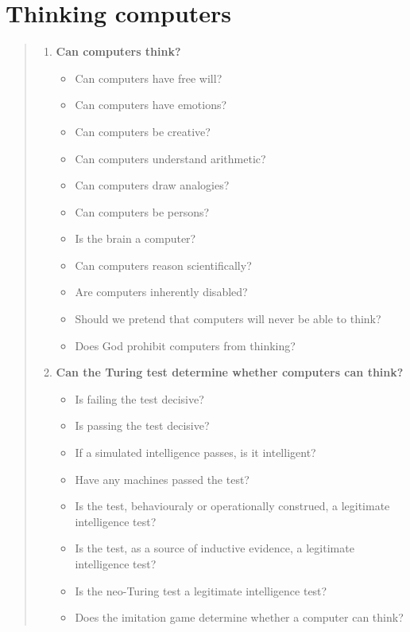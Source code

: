 
\chapter{Thinking computers}
\label{app:think}


\begin{quotation}
  \begin{enumerate}
    \item \textbf{Can computers think?}
      \begin{itemize}
        \item Can computers have free will?
        \item Can computers have emotions?
        \item Can computers be creative?
        \item Can computers understand arithmetic?
        \item Can computers draw analogies?
        \item Can computers be persons?
        \item Is the brain a computer?
        \item Can computers reason scientifically?
        \item Are computers inherently disabled?
        \item Should we pretend that computers will never be able to think?
        \item Does God prohibit computers from thinking?
      \end{itemize}
    \item \textbf{Can the Turing test determine whether computers can think?}
      \begin{itemize}
        \item Is failing the test decisive?
        \item Is passing the test decisive?
        \item If a simulated intelligence passes, is it intelligent?
        \item Have any machines passed the test?
        \item Is the test, behaviouraly or operationally construed, a legitimate intelligence test?
        \item Is the test, as a source of inductive evidence, a legitimate intelligence test?
        \item Is the neo-Turing test a legitimate intelligence test?
        \item Does the imitation game determine whether a computer can think?

\end{itemize}
\end{enumerate}
\end{quotation}
